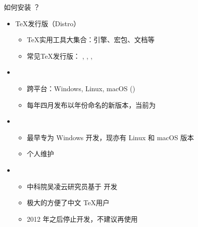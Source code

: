 \begin{frame}{如何安装 ？}
  \begin{itemize}
    \item \TeX{}发行版（Distro）
      \begin{itemize}
        \item \TeX{}实用工具大集合：引擎、宏包、文档等
        \item 常见\TeX{}发行版：
          \alert{\TL}, \CTeX, \MiKTeX, \MacTeX
      \end{itemize}
    \item \TL
      \begin{itemize}
        \item 跨平台：Windows, Linux, macOS (\MacTeX)
        \item 每年四月发布以年份命名的新版本，当前为 \TL \TLVersion
      \end{itemize}
    \item \MiKTeX
      \begin{itemize}
        \item 最早专为 Windows 开发，现亦有 Linux 和 macOS 版本
        \item 个人维护
      \end{itemize}
    \item \CTeX
      \begin{itemize}
        \item 中科院吴凌云研究员基于 \MiKTeX 开发
        \item 极大的方便了中文 \TeX 用户
        \item 2012 年之后停止开发，不建议再使用
      \end{itemize}
  \end{itemize}
\end{frame}

